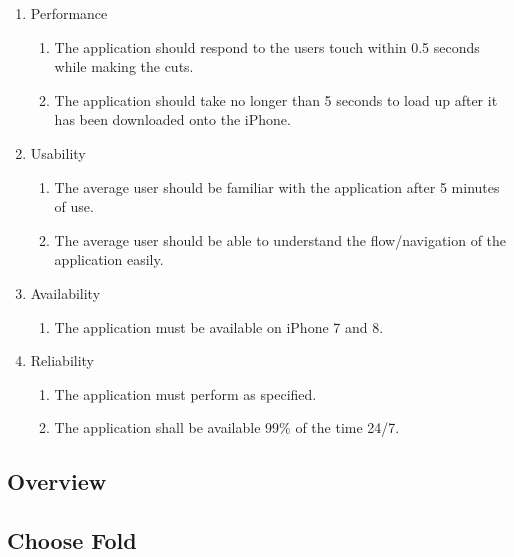 \documentclass[11pt]{article}
\begin{document}
    \begin{enumerate}
        \item Performance
            \begin{enumerate}[label*=\arabic*.]
            \item The application should respond to the users touch within 0.5 seconds while making the cuts.
            \item The application should take no longer than 5 seconds to load up after it has been downloaded onto the iPhone.
            \end{enumerate}
            
        \item Usability
            \begin{enumerate}[label*=\arabic*.]
            \item The average user should be familiar with the application after 5 minutes of use. 
            \item The average user should be able to understand the flow/navigation of the application easily.
            \end{enumerate}
            
        \item Availability
            \begin{enumerate}[label*=\arabic*.]
            \item The application must be available on iPhone 7 and 8.
            \end{enumerate}
            
        \item Reliability
            \begin{enumerate}[label*=\arabic*.]
            \item The application must perform as specified.
            \item The application shall be available 99\% of the time 24/7.
            \end{enumerate}
         
    \end{enumerate}
    \clearpage
    
    \subsection{Overview}
        \subsection{Choose Fold}
\end{document}
